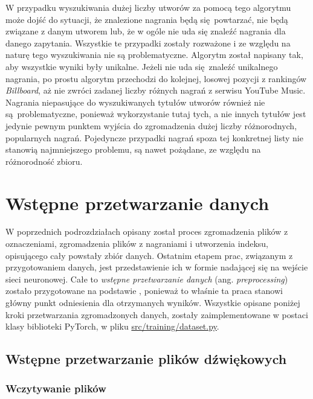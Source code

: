 W przypadku wyszukiwania dużej liczby utworów za pomocą tego algorytmu może dojść do sytuacji, że znalezione nagrania będą się powtarzać, nie będą związane z danym utworem lub, że w ogóle nie uda się znaleźć nagrania dla danego zapytania. Wszystkie te przypadki zostały rozważone i ze względu na naturę tego wyszukiwania nie są problematyczne. Algorytm został napisany tak, aby wszystkie wyniki były unikalne. Jeżeli nie uda się znaleźć unikalnego nagrania, po prostu algorytm przechodzi do kolejnej, losowej pozycji z rankingów \emph{Billboard}, aż nie zwróci zadanej liczby różnych nagrań z serwisu YouTube Music. Nagrania niepasujące do wyszukiwanych tytułów utworów również nie są problematyczne, ponieważ wykorzystanie tutaj tych, a nie innych tytułów jest jedynie pewnym punktem wyjścia do zgromadzenia dużej liczby różnorodnych, popularnych nagrań. Pojedyncze przypadki nagrań spoza tej konkretnej listy nie stanowią najmniejszego problemu, są nawet pożądane, ze względu na różnorodność zbioru.

\section{Wstępne przetwarzanie danych} \label{sec:preprocessing}

W poprzednich podrozdziałach opisany został proces zgromadzenia plików z oznaczeniami, zgromadzenia plików z nagraniami i utworzenia indeksu, opisującego cały powstały zbiór danych. Ostatnim etapem prac, związanym z przygotowaniem danych, jest przedstawienie ich w formie nadającej się na wejście sieci neuronowej. Całe to \emph{wstępne przetwarzanie danych} (ang. \emph{preprocessing}) zostało przygotowane na podstawie \cite{park_bi-directional_2019}, ponieważ to właśnie ta praca stanowi główny punkt odniesienia dla otrzymanych wyników. Wszystkie opisane poniżej kroki przetwarzania zgromadzonych danych, zostały zaimplementowane w postaci klasy  biblioteki PyTorch, w pliku \url{src/training/dataset.py}.

\subsection{Wstępne przetwarzanie plików dźwiękowych}

\subsubsection{Wczytywanie plików}

